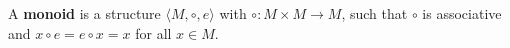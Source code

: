 \documentclass{stex}
\begin{document}
\begin{definition}
  A \textbf{monoid} is a structure $\langle M,\circ,e\rangle$
  with $\circ:M\times M\to M$, such that $\circ$ is associative and
  $x\circ e=e \circ x = x$ for all $x\in M$.
\end{definition}
\end{document}
